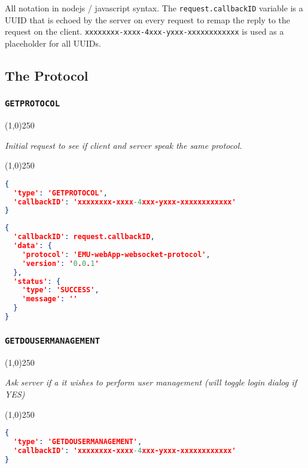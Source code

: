 \documentclass[A4,12pt, utf8]{article}
\begin{document}
All notation in nodejs / javascript syntax. The \texttt{request.callbackID} variable is a UUID that is echoed by the server on every request to remap the reply to the request on the client. \texttt{xxxxxxxx-xxxx-4xxx-yxxx-xxxxxxxxxxxx} is used as a placeholder for all UUIDs.


\subsection{The Protocol}

\subsubsection{\texttt{GETPROTOCOL}}
\begin{center}
  \line(1,0){250}

  \textit{Initial request to see if client and server speak the same protocol.}

  \line(1,0){250}
\end{center}


\begin{lstlisting}[caption=Request content, language=json]
{
  'type': 'GETPROTOCOL', 
  'callbackID': 'xxxxxxxx-xxxx-4xxx-yxxx-xxxxxxxxxxxx'
}
\end{lstlisting}

\begin{lstlisting}[caption=Reply content, language=json]
{
  'callbackID': request.callbackID,
  'data': {
    'protocol': 'EMU-webApp-websocket-protocol',
    'version': '0.0.1'
  },
  'status': {
    'type': 'SUCCESS',
    'message': ''
  }
}
\end{lstlisting}

\subsubsection{\texttt{GETDOUSERMANAGEMENT}}
\begin{center}
  \line(1,0){250}

  \textit{Ask server if a it wishes to perform user management (will toggle login dialog if YES)}

  \line(1,0){250}
\end{center}


\begin{lstlisting}[caption=Request content, language=json]
{
  'type': 'GETDOUSERMANAGEMENT', 
  'callbackID': 'xxxxxxxx-xxxx-4xxx-yxxx-xxxxxxxxxxxx'
}
\end{lstlisting}
\end{document}

